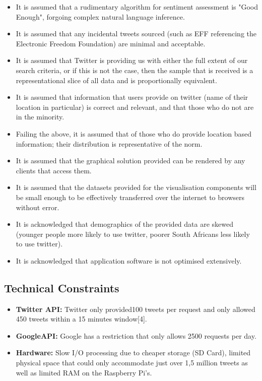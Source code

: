 \documentclass[12pt]{article} %
\begin{document}
\begin{itemize}
	
	
	\item It is assumed that a rudimentary algorithm for sentiment assessment is "Good Enough", forgoing complex natural language inference. 
	
	\item It is assumed that any incidental tweets sourced (such as EFF referencing the Electronic Freedom Foundation) are minimal and acceptable.
	
	\item It is assumed that Twitter is providing us with either the full extent of our search criteria, or if this is not the case, then the sample that is received is a representational slice of all data and is proportionally equivalent.
	
	\item It is assumed that information that users provide on twitter (name of their location in particular) is correct and relevant, and that those who do not are in the minority.
	
	\item Failing the above, it is assumed that of those who do provide location based information; their distribution is representative of the norm.
	
	\item It is assumed that the graphical solution provided can be rendered by any clients that access them.
	
	\item It is assumed that the datasets provided for the visualisation components will be small enough to be effectively transferred over the internet to browsers without error.
	
	\item It is acknowledged that demographics of the provided data are skewed (younger people more likely to use twitter, poorer South Africans less likely to use twitter).
	
	\item It is acknowledged that application software is not optimised extensively.
\end{itemize}

\subsection {Technical Constraints}

\begin{itemize}
	\item \textbf{Twitter API:} Twitter only provided100 tweets per request and only allowed 450 tweets within a 15 minutes window[4].
	\item \textbf{GoogleAPI:} Google has a restriction that only allows 2500 requests   per day.
	\item \textbf{Hardware:} Slow I/O processing due to cheaper storage (SD Card), limited physical space that could only accommodate just over 1,5 million tweets as well as limited RAM on the Raspberry Pi's.
\end{itemize}
\end{document}
